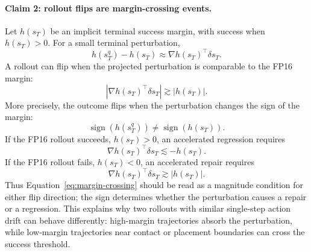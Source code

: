 \documentclass[10pt]{article}
\begin{document}
\paragraph{Claim 2: rollout flips are margin-crossing events.}
Let $h(s_T)$ be an implicit terminal success margin, with success when $h(s_T)>0$. For a small terminal perturbation,
\begin{equation}
    h(s_T^q)-h(s_T)
    \approx \nabla h(s_T)^\top \delta s_T .
\end{equation}
A rollout can flip when the projected perturbation is comparable to the FP16 margin:
\begin{equation}
    \left|\nabla h(s_T)^\top \delta s_T\right|
    \gtrsim \left|h(s_T)\right|.
    \label{eq:margin-crossing}
\end{equation}
More precisely, the outcome flips when the perturbation changes the sign of the margin:
\begin{equation}
    \operatorname{sign}\!\left(h(s_T^q)\right)
    \ne
    \operatorname{sign}\!\left(h(s_T)\right).
\end{equation}
If the FP16 rollout succeeds, $h(s_T)>0$, an accelerated regression requires
\begin{equation}
    \nabla h(s_T)^\top \delta s_T \lesssim -h(s_T).
\end{equation}
If the FP16 rollout fails, $h(s_T)<0$, an accelerated repair requires
\begin{equation}
    \nabla h(s_T)^\top \delta s_T \gtrsim |h(s_T)|.
\end{equation}
Thus Equation~\ref{eq:margin-crossing} should be read as a magnitude condition for either flip direction; the sign determines whether the perturbation causes a repair or a regression. This explains why two rollouts with similar single-step action drift can behave differently: high-margin trajectories absorb the perturbation, while low-margin trajectories near contact or placement boundaries can cross the success threshold.
\end{document}
